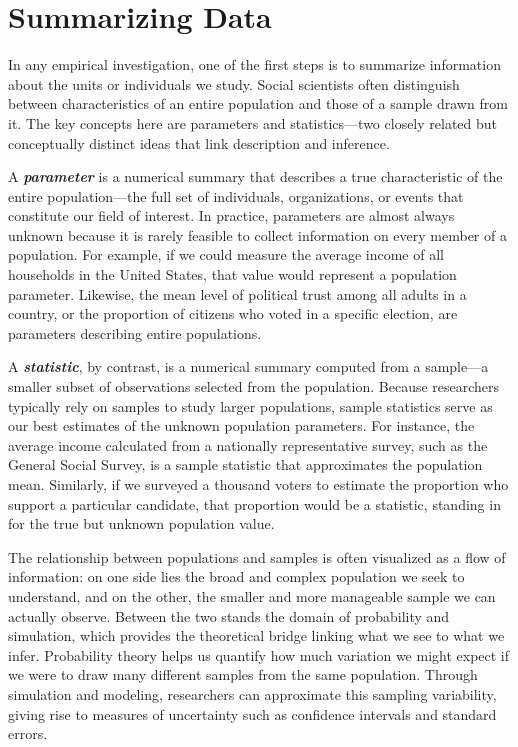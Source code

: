 \documentclass[
  letterpaper,
  DIV=11,
  numbers=noendperiod]{scrreprt}
\begin{document}
\section{Summarizing Data}\label{summarizing-data}

In any empirical investigation, one of the first steps is to summarize
information about the units or individuals we study. Social scientists
often distinguish between characteristics of an entire population and
those of a sample drawn from it. The key concepts here are parameters
and statistics---two closely related but conceptually distinct ideas
that link description and inference.

A \textbf{\emph{parameter}} is a numerical summary that describes a true
characteristic of the entire population---the full set of individuals,
organizations, or events that constitute our field of interest. In
practice, parameters are almost always unknown because it is rarely
feasible to collect information on every member of a population. For
example, if we could measure the average income of all households in the
United States, that value would represent a population parameter.
Likewise, the mean level of political trust among all adults in a
country, or the proportion of citizens who voted in a specific election,
are parameters describing entire populations.

A \textbf{\emph{statistic}}, by contrast, is a numerical summary
computed from a sample---a smaller subset of observations selected from
the population. Because researchers typically rely on samples to study
larger populations, sample statistics serve as our best estimates of the
unknown population parameters. For instance, the average income
calculated from a nationally representative survey, such as the General
Social Survey, is a sample statistic that approximates the population
mean. Similarly, if we surveyed a thousand voters to estimate the
proportion who support a particular candidate, that proportion would be
a statistic, standing in for the true but unknown population value.

The relationship between populations and samples is often visualized as
a flow of information: on one side lies the broad and complex population
we seek to understand, and on the other, the smaller and more manageable
sample we can actually observe. Between the two stands the domain of
probability and simulation, which provides the theoretical bridge
linking what we see to what we infer. Probability theory helps us
quantify how much variation we might expect if we were to draw many
different samples from the same population. Through simulation and
modeling, researchers can approximate this sampling variability, giving
rise to measures of uncertainty such as confidence intervals and
standard errors.
\end{document}
